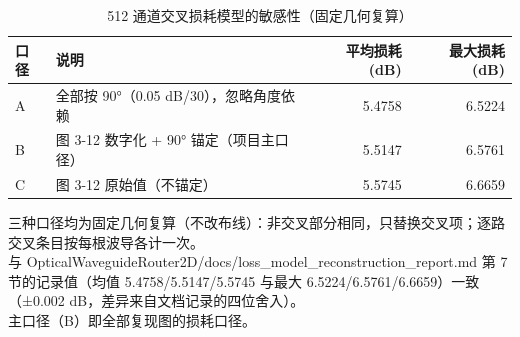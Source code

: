 \begin{table}[htbp]
  \centering
  \caption{512 通道交叉损耗模型的敏感性（固定几何复算）}
  \label{tab:crossing-sensitivity}
  \begin{tabular}{llrr}
    \toprule
    口径 & 说明 & 平均损耗 (dB) & 最大损耗 (dB) \\
    \midrule
    A & 全部按 90°（0.05 dB/30），忽略角度依赖 & 5.4758 & 6.5224 \\
    B & 图 3-12 数字化 + 90° 锚定（项目主口径） & 5.5147 & 6.5761 \\
    C & 图 3-12 原始值（不锚定） & 5.5745 & 6.6659 \\
    \bottomrule
  \end{tabular}
  \par\vspace{2pt}
  \begin{flushleft}\footnotesize
  三种口径均为固定几何复算（不改布线）：非交叉部分相同，只替换交叉项；逐路交叉条目按每根波导各计一次。 \\
  与 OpticalWaveguideRouter2D/docs/loss\_model\_reconstruction\_report.md 第 7 节的记录值（均值 5.4758/5.5147/5.5745 与最大 6.5224/6.5761/6.6659）一致（±0.002 dB，差异来自文档记录的四位舍入）。 \\
  主口径（B）即全部复现图的损耗口径。 \\
  \end{flushleft}
\end{table}
